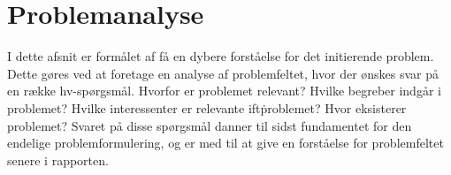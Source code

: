 \section{Problemanalyse}
I dette afsnit er formålet af få en dybere forståelse for det initierende problem. Dette gøres ved at foretage en analyse af problemfeltet, hvor der ønskes svar på en række hv-spørgsmål. Hvorfor er problemet relevant? Hvilke begreber indgår i problemet? Hvilke interessenter er relevante ift\. problemet? Hvor eksisterer problemet? Svaret på disse spørgsmål danner til sidst fundamentet for den endelige problemformulering, og er med til at give en forståelse for problemfeltet senere i rapporten.


\clearpage

\clearpage

\clearpage

\clearpage